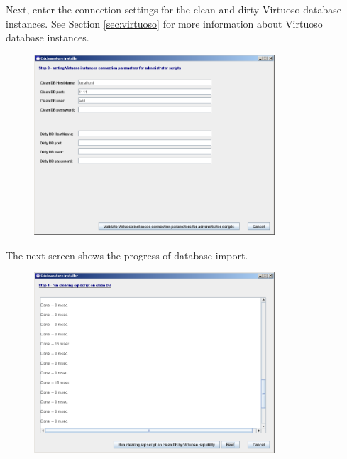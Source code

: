 \FloatBarrier

Next, enter the connection settings for the clean and dirty Virtuoso database instances. See Section \ref{sec:virtuoso} for more information about Virtuoso database instances.

\begin{figure}[!h]
    \centering
    \includegraphics[width=0.8\textwidth]{images/install-step03.png}
\end{figure}

\FloatBarrier

The next screen shows the progress of database import.

\begin{figure}[!h]
    \centering
    \includegraphics[width=0.8\textwidth]{images/install-step04.png}
\end{figure}

\FloatBarrier

